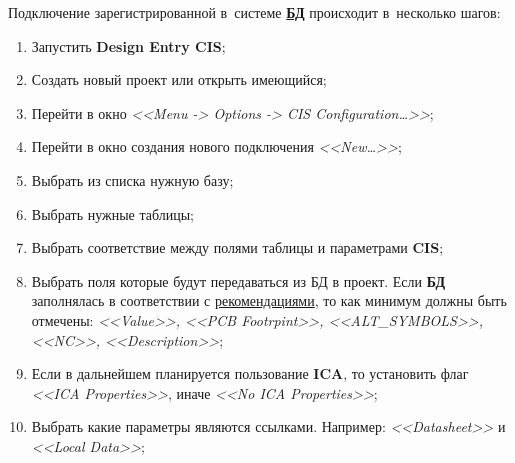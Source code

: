 Подключение зарегистрированной в~системе \hyperlink{sssec:bd_install}{\textbf{БД}} происходит в~несколько шагов:
\begin{enumerate}
	\item Запустить \textbf{Design Entry CIS};
	\item Создать новый проект или открыть имеющийся;
	\item Перейти в окно \textit{<<Menu -> Options -> CIS Configuration\ldots>>};
		\begin{figure}[H]
		\end{figure}
	\item Перейти в окно создания нового подключения \textit{<<New\ldots>>};
	\item Выбрать из списка нужную базу;
	\item Выбрать нужные таблицы;
		\begin{figure}[H]
		\end{figure}
	\item Выбрать соответствие между полями таблицы и параметрами \textbf{CIS}; 
		\begin{figure}[H]
		\end{figure}
		\begin{figure}[H]
		\end{figure}		
	\item Выбрать поля которые будут передаваться из БД в проект. Если \textbf{БД} заполнялась в соответствии с \hyperlink{sssec:bd_contet}{рекомендациями}, то как минимум должны быть отмечены: \textit{<<Value>>, <<PCB Footrpint>>, <<ALT\_SYMBOLS>>, <<NC>>, <<Description>>};
		\begin{figure}[H]
		\end{figure}
	\item Если в дальнейшем планируется пользование \textbf{ICA}, то установить флаг \textit{<<ICA Properties>>}, иначе \textit{<<No ICA Properties>>};
		\begin{figure}[H]
		\end{figure}
	\item Выбрать какие параметры являются ссылками. Например: \textit{<<Datasheet>>} и \textit{<<Local Data>>};

\end{enumerate}
